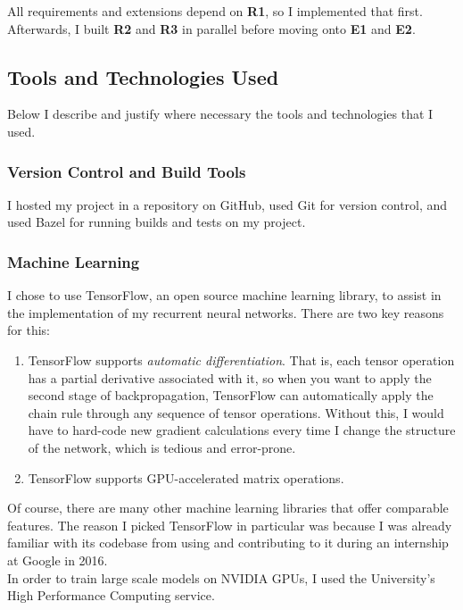 \documentclass[a4paper, 12pt]{report}
\newcommand{\tbf}[1]{\textbf{#1}}
\newcommand{\tit}[1]{\textit{#1}}
\begin{document}
All requirements and extensions depend on \tbf{R1}, so I implemented that first. Afterwards, I built \tbf{R2} and \tbf{R3} in parallel before moving onto \tbf{E1} and \tbf{E2}.

\subsection{Tools and Technologies Used} \label{tools}

Below I describe and justify where necessary the tools and technologies that I used.

\subsubsection{Version Control and Build Tools}

I hosted my project in a repository on GitHub, used Git for version control, and used Bazel for running builds and tests on my project.

\subsubsection{Machine Learning}

I chose to use TensorFlow, an open source machine learning library, to assist in the implementation of my recurrent neural networks. There are two key reasons for this:
\begin{enumerate}
\item
	TensorFlow supports \tit{automatic differentiation}. That is, each tensor operation has a partial derivative associated with it, so when you want to apply the second stage of backpropagation, TensorFlow can automatically apply the chain rule through any sequence of tensor operations. Without this, I would have to hard-code new gradient calculations every time I change the structure of the network, which is tedious and error-prone.
\item
	TensorFlow supports GPU-accelerated matrix operations.
\end{enumerate}
Of course, there are many other machine learning libraries that offer comparable features. The reason I picked TensorFlow in particular was because I was already familiar with its codebase from using and contributing to it during an internship at Google in 2016. \\

In order to train large scale models on NVIDIA GPUs, I used the University's High Performance Computing service.
\end{document}
